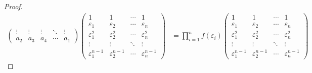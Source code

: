 \documentclass[class=nhvh-linear-algebra,crop=false]{standalone}
\begin{document}
\begin{proof}
\begin{align*}
\begin{pmatrix}
            \vdots  & \vdots & \vdots & \ddots & \vdots  \\
            a_{2}   & a_{3}  & a_{4}  & \cdots & a_{1}
        \end{pmatrix}
        \begin{pmatrix}
            1                     & 1                     & \cdots & 1                     \\
            \varepsilon_{1}       & \varepsilon_{2}       & \cdots & \varepsilon_{n}       \\
            \varepsilon_{1}^{2}   & \varepsilon_{2}^{2}   & \cdots & \varepsilon_{n}^{2}   \\
            \vdots                & \vdots                & \ddots & \vdots                \\
            \varepsilon_{1}^{n-1} & \varepsilon_{2}^{n-1} & \cdots & \varepsilon_{n}^{n-1}
        \end{pmatrix}
         & = \prod^{n}_{i=1}f(\varepsilon_{i})
        \begin{pmatrix}
            1                     & 1                     & \cdots & 1                     \\
            \varepsilon_{1}       & \varepsilon_{2}       & \cdots & \varepsilon_{n}       \\
            \varepsilon_{1}^{2}   & \varepsilon_{2}^{2}   & \cdots & \varepsilon_{n}^{2}   \\
            \vdots                & \vdots                & \ddots & \vdots                \\
            \varepsilon_{1}^{n-1} & \varepsilon_{2}^{n-1} & \cdots & \varepsilon_{n}^{n-1}
        \end{pmatrix}
    \end{align*}
    \endgroup{}


\end{proof}
\end{document}
